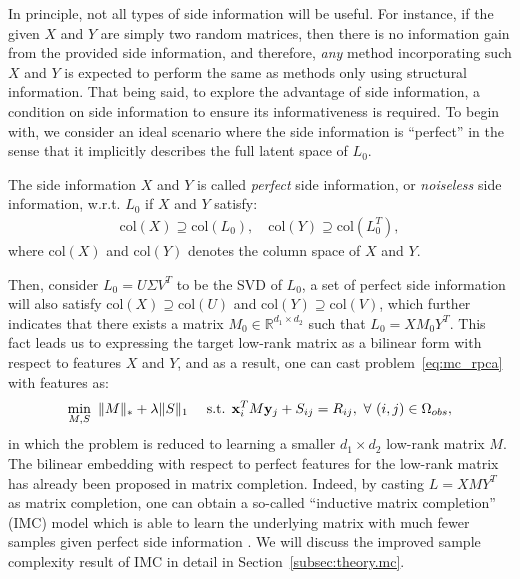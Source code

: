 \documentclass[twoside,11pt]{article}
\def\bx{{\bf x}}
\def\by{{\bf y}}
\def\R{\mathbb{R}}
\def\Obs{\Omega_{obs}}
\def\col{\text{col}}
\def\realL{L_0}
\def\realM{M_0}
\begin{document}
In principle, not all types of side information will be useful.
For instance, if the given $X$ and $Y$ are simply two random matrices, then there is no
information gain from the provided side information, and therefore, {\it any} method incorporating
such $X$ and $Y$ is expected to perform the same as methods only using structural information.
That being said, to explore the advantage of side information, a condition on side information
to ensure its informativeness is required.
To begin with, we consider an ideal scenario where the side information is ``perfect''
in the sense that it implicitly describes the full latent space of $\realL$.
\begin{definition}
  The side information $X$ and $Y$ is called {\it perfect} side information, or {\it noiseless} side information,
w.r.t. $\realL$ if $X$ and $Y$ satisfy:
\begin{align}
  \col(X) \supseteq \col(\realL), \quad \col(Y) \supseteq \col(\realL^T),
  \label{eq:perfect_feature}
\end{align}
where $\col(X)$ and $\col(Y)$ denotes the column space of $X$ and $Y$.
\end{definition}
Then, consider $\realL = U\Sigma V^T$ to be the SVD of $\realL$, a set of perfect side information will also satisfy
$\col(X) \supseteq \col(U)$ and $\col(Y) \supseteq \col(V)$, which further indicates that
there exists a matrix $\realM \in \R^{d_1 \times d_2}$ such that
$\realL = X \realM Y^T$.  This fact leads us to expressing the target low-rank matrix as a bilinear
form with respect to features $X$ and $Y$, and as a result, one can cast
problem~\eqref{eq:mc_rpca} with features as:
\begin{align}
  \min_{M, S} \  \|M\|_* + \lambda\|S\|_1 \quad
  \text{ s.t. }   \bx_i^T M \by_j + S_{ij} = R_{ij}, \ \forall \ (i,j)\in \Obs,
  \label{eq:imc_rpca}
\end{align}
in which the problem is reduced to learning a smaller $d_1\times d_2$ low-rank matrix $M$.
The bilinear embedding with respect to perfect features for the low-rank matrix
has already been proposed in matrix completion.  Indeed, %
by casting $L = XMY^T$ as matrix completion, one can obtain a so-called
``inductive matrix completion'' (IMC) model which is able to learn the underlying matrix
with much fewer samples
given perfect side information
\citep{Jain13b, Xu13a, Zhong15a}.  We will discuss the improved sample complexity result
of IMC in detail in Section~\ref{subsec:theory.mc}.
\end{document}
